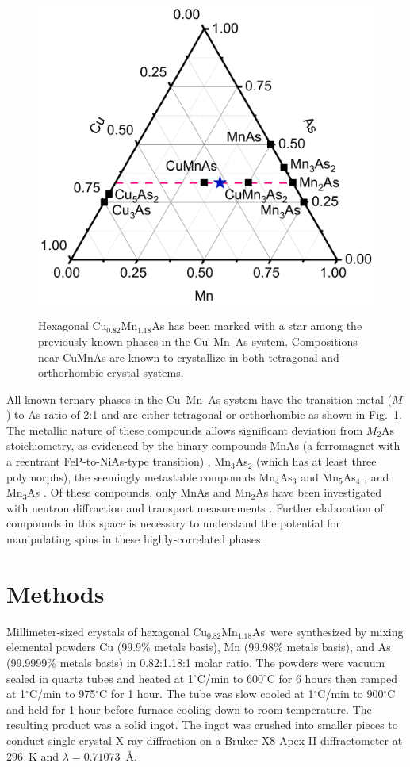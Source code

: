 \documentclass[10pt,doublespacing,edeposit]{uiucthesis2020}
\newcommand*{\cumnas}{Cu$_{0.82}$Mn$_{1.18}$As}
\begin{document}
\begin{mainmatter}
\begin{figure}
\centering\includegraphics[width=0.6\columnwidth]{figures/ch5/phase_diagram_cropped.pdf} \\
\caption{\label{fig:phase_diagram}
{\color{black}Hexagonal Cu$_{0.82}$Mn$_{1.18}$As has been marked with a star among the previously-known phases in the Cu--Mn--As system. Compositions near CuMnAs are known to crystallize in both tetragonal and orthorhombic crystal systems.}
} 
\end{figure}

{\color{black} All known ternary phases in the Cu--Mn--As system have the transition metal ($M$) to As ratio of 2:1 and are either tetragonal or orthorhombic as shown in Fig.\ \ref{fig:phase_diagram}.}
The metallic nature of these compounds allows significant deviation from $M_2$As stoichiometry, as evidenced by the binary compounds MnAs (a ferromagnet with a reentrant FeP-to-NiAs-type transition) \cite{Pytlik1985,Schwartz1971,Glazkov2003}, Mn$_3$As$_2$ (which has at least three polymorphs)\cite{Dietrich1990,Moller1993,Hagedorn1994}, the seemingly metastable compounds Mn$_4$As$_3$ and Mn$_5$As$_4$ \cite{Hagedorn1995,Moller1993}, and Mn$_3$As \cite{nowotny_kristallchemische_1951}.
Of these compounds, only MnAs and Mn$_2$As have been investigated with neutron diffraction and transport measurements \cite{Yuzuri1960,Austin1962}.
Further elaboration of compounds in this space is necessary to understand the potential for manipulating spins in these highly-correlated phases.

\section{Methods}

Millimeter-sized crystals of hexagonal \cumnas\ were synthesized by mixing elemental powders Cu (99.9\% metals basis), Mn (99.98\% metals basis), and As (99.9999\% metals basis) in 0.82:1.18:1 molar ratio. 
The powders were vacuum sealed in quartz tubes and heated at 1$^\circ$C/min to 600$^{\circ}$C for 6 hours then ramped at 1$^{\circ}$C/min to 975$^{\circ}$C for 1 hour. The tube was slow cooled at 1$^{\circ}$C/min to 900$^{\circ}$C and held for 1 hour before furnace-cooling down to room temperature. The resulting product was a solid ingot. The ingot was crushed into smaller pieces to conduct single crystal X-ray diffraction on a Bruker X8 Apex II diffractometer at 296~K and $\lambda = 0.71073$~\AA. 



\end{mainmatter}
\end{document}
